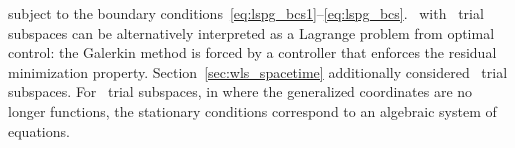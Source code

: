 subject to the boundary conditions~\eqref{eq:lspg_bcs1}--\eqref{eq:lspg_bcs}. \methodAcronym\ with \spatialAcronym\ trial subspaces can be alternatively interpreted as a Lagrange problem from optimal control: the Galerkin method is forced by a 
controller that enforces the residual minimization property. 
Section~\ref{sec:wls_spacetime} additionally considered \spaceTimeAcronym\ trial subspaces. For \spaceTimeAcronym\ trial subspaces, in where the generalized coordinates are no longer functions, the stationary conditions correspond to an algebraic system of equations.
